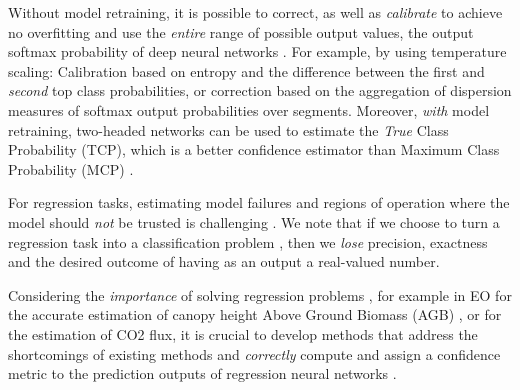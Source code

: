 Without model retraining, it is possible to correct, as well as \textit{calibrate} to achieve no overfitting and use the \textit{entire} range of possible output values, the output softmax probability of deep neural networks \cite{Confidence1}. %
For example, by using temperature scaling: Calibration based on entropy and the difference between the first and \textit{second} top class probabilities, or correction based on the aggregation of dispersion measures of softmax output probabilities over segments. 
Moreover, \textit{with} model retraining, two-headed networks can be used to estimate the \textit{True} Class Probability (TCP), which is a better confidence estimator than Maximum Class Probability (MCP) \cite{Confquantification4}.

For regression tasks, estimating model failures and regions of operation where the model should \textit{not} be trusted is challenging \cite{RegrConfi}.       
We note that if we choose to turn a regression task into a classification problem \cite{regressionregressionnew2}, then we \textit{lose} precision, exactness and the desired outcome of having as an output a real-valued number. %




















Considering the \textit{importance} of solving regression problems \cite{regressionregressionnew1}, for example in EO for the accurate estimation of canopy height Above Ground Biomass (AGB) \cite{Prithvi1}, or for the estimation of CO2 flux, it is crucial to develop methods that address the shortcomings of existing methods and \textit{correctly} compute and assign a confidence metric to the prediction outputs of regression neural networks \cite{Confquantification2}.



